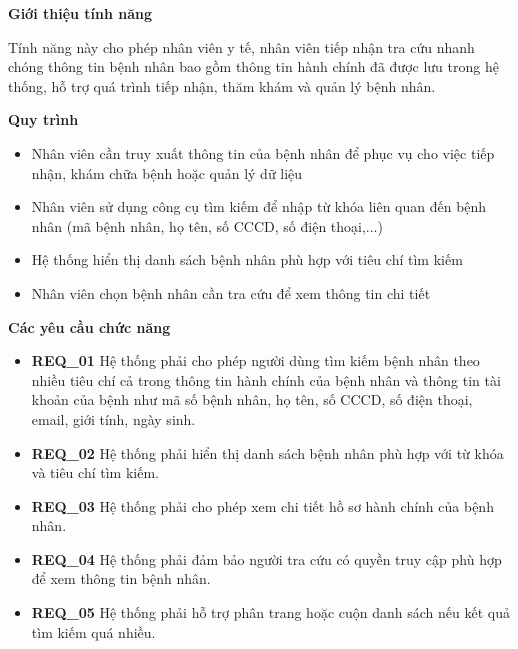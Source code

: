 \noindent \textbf{Giới thiệu tính năng}

Tính năng này cho phép nhân viên y tế, nhân viên tiếp nhận tra cứu nhanh chóng thông tin bệnh nhân bao gồm thông tin hành chính đã được lưu trong hệ thống, hỗ trợ quá trình tiếp nhận, thăm khám và quản lý bệnh nhân.

\noindent \textbf{Quy trình}

\begin{itemize}

\item Nhân viên cần truy xuất thông tin của bệnh nhân để phục vụ cho việc tiếp nhận, khám chữa bệnh hoặc quản lý dữ liệu

\item Nhân viên sử dụng công cụ tìm kiếm để nhập từ khóa liên quan đến bệnh nhân (mã bệnh nhân, họ tên, số CCCD, số điện thoại,...)

\item Hệ thống hiển thị danh sách bệnh nhân phù hợp với tiêu chí tìm kiếm

\item Nhân viên chọn bệnh nhân cần tra cứu để xem thông tin chi tiết

\end{itemize}

\noindent \textbf{Các yêu cầu chức năng}

\begin{itemize}

\item \textbf{REQ\_01} Hệ thống phải cho phép người dùng tìm kiếm bệnh nhân theo nhiều tiêu chí cả trong thông tin hành chính của bệnh nhân và thông tin tài khoản của bệnh như mã số bệnh nhân, họ tên, số CCCD, số điện thoại, email, giới tính, ngày sinh.

\item \textbf{REQ\_02} Hệ thống phải hiển thị danh sách bệnh nhân phù hợp với từ khóa và tiêu chí tìm kiếm.

\item \textbf{REQ\_03} Hệ thống phải cho phép xem chi tiết hồ sơ hành chính của bệnh nhân.

\item \textbf{REQ\_04} Hệ thống phải đảm bảo người tra cứu có quyền truy cập phù hợp để xem thông tin bệnh nhân.

\item \textbf{REQ\_05} Hệ thống phải hỗ trợ phân trang hoặc cuộn danh sách nếu kết quả tìm kiếm quá nhiều.

\end{itemize}

